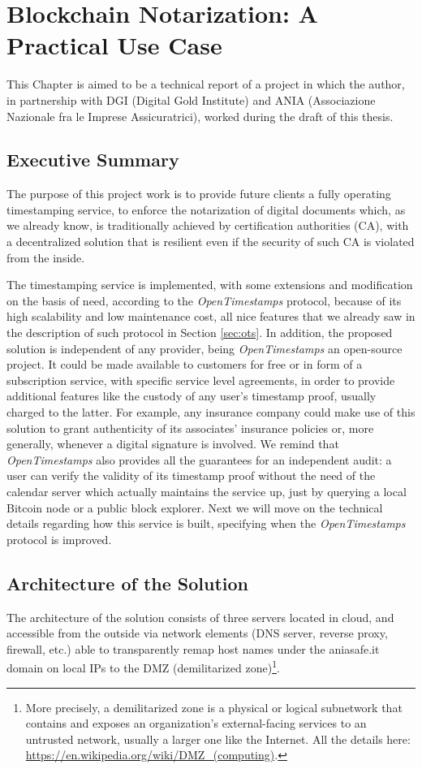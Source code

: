 \chapter{Blockchain Notarization: A Practical Use Case}
\label{chpr:project}
This Chapter is aimed to be a technical report of a project in which the author, in partnership with DGI (Digital Gold Institute) and ANIA (Associazione Nazionale fra le Imprese Assicuratrici), worked during the draft of this thesis.

\bigskip
\section{Executive Summary}
\label{sec:summary}
The purpose of this project work is to provide future clients a fully operating timestamping service, to enforce the notarization of digital documents which, as we already know, is traditionally achieved by certification authorities (CA), with a decentralized solution that is resilient even if the security of such CA is violated from the inside.

\bigskip
\noindent
The timestamping service is implemented, with some extensions and modification on the basis of need, according to the \textit{OpenTimestamps} protocol, because of its high scalability and low maintenance cost, all nice features that we already saw in the description of such protocol in Section \ref{sec:ots}. In addition, the proposed solution is independent of any provider, being \textit{OpenTimestamps} an open-source project. It could be made available to customers for free or in form of a subscription service, with specific service level agreements, in order to provide additional features like the custody of any user's timestamp proof, usually charged to the latter. For example, any insurance company could make use of this solution to grant authenticity of its associates' insurance policies or, more generally, whenever a digital signature is involved. We remind that \textit{OpenTimestamps} also provides all the guarantees for an independent audit: a user can verify the validity of its timestamp proof without the need of the calendar server which actually maintains the service up, just by querying a local Bitcoin node or a public block explorer. Next we will move on the technical details regarding how this service is built, specifying when the \textit{OpenTimestamps} protocol is improved.

\bigskip
\section{Architecture of the Solution}
\label{sec:architecture}
The architecture of the solution consists of three servers located in cloud, and accessible from the outside via network elements (DNS server, reverse proxy, firewall, etc.) able to transparently remap host names under the aniasafe.it domain on local IPs to the DMZ (demilitarized zone)\footnote{More precisely, a demilitarized zone is a physical or logical subnetwork that contains and exposes an organization's external-facing services to an untrusted network, usually a larger one like the Internet. All the details here: \url{https://en.wikipedia.org/wiki/DMZ_(computing)}.}.


